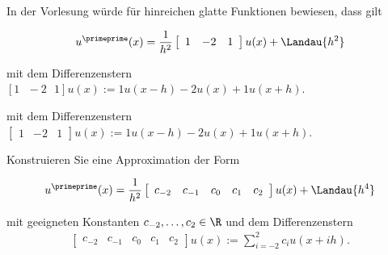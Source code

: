 \begin{exercise}
  In der Vorlesung würde für hinreichen glatte Funktionen bewiesen, dass gilt

  \begin{align*}
    u^\primeprime (x) = \frac{1}{h^2}\left[
    \begin{array}{ccc}
      1 & -2 & 1
    \end{array}
    \right] u(x) +
    \Landau{h^2}
  \end{align*}


  mit dem Differenzenstern $[1 \text{ }  -2 \text{ } 1]u(x):= 1u(x-h)-2u(x)+1u(x+h)$.

  mit dem Differenzenstern $\left[
  \begin{array}{ccc}
    1 & -2 & 1
  \end{array}
  \right]u(x):= 1u(x-h)-2u(x)+1u(x+h)$.

  Konstruieren Sie eine Approximation der Form

  \begin{align*}
    u^\primeprime (x) = \frac{1}{h^2} \left[
    \begin{array}{ccccc}
    c_{-2} & c_{-1} & c_0 & c_1 & c_ 2
    \end{array}
    \right]
    u(x) + \Landau{h^4}
  \end{align*}

  mit geeigneten Konstanten $c_{-2}, \dots , c_2 \in \R$ und dem Differenzenstern
  \begin{align*}
    \left[
    \begin{array}{ccccc}
        c_{-2} & c_{-1} & c_0 & c_1 & c_ 2
    \end{array}
    \right]
    u(x)
    :=
    \sum_{i=-2}^2 c_i u(x+ih).
  \end{align*}
\end{exercise}

